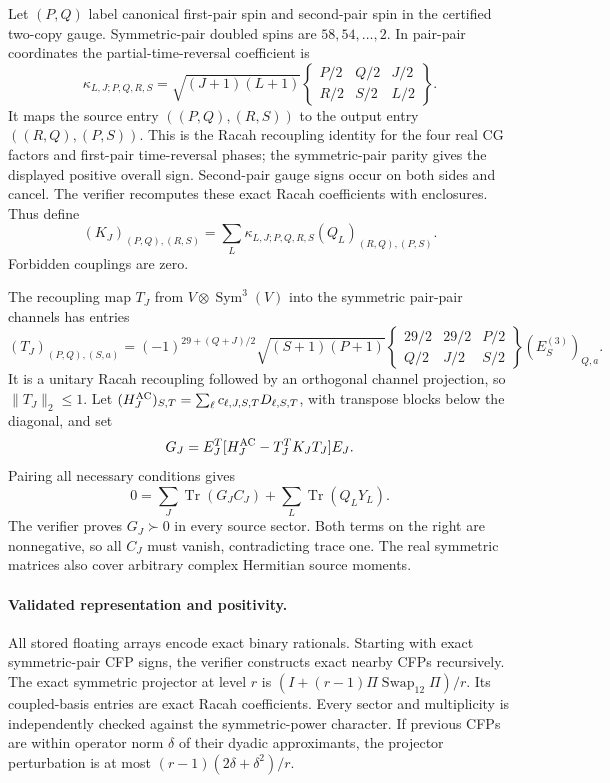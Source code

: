\documentclass[11pt]{article}
\newcommand{\Tr}{\operatorname{Tr}}
\begin{document}
Let $(P,Q)$ label canonical first-pair spin and second-pair spin in the certified two-copy gauge. Symmetric-pair doubled spins are $58,54,\ldots,2$. In pair-pair coordinates the partial-time-reversal coefficient is
\[
 \kappa_{L,J;P,Q,R,S}=\sqrt{(J+1)(L+1)}
 \begin{Bmatrix}P/2&Q/2&J/2\\R/2&S/2&L/2\end{Bmatrix}.
\]
It maps the source entry $((P,Q),(R,S))$ to the output entry $((R,Q),(P,S))$. This is the Racah recoupling identity for the four real CG factors and first-pair time-reversal phases; the symmetric-pair parity gives the displayed positive overall sign. Second-pair gauge signs occur on both sides and cancel. The verifier recomputes these exact Racah coefficients with enclosures. Thus define
\[
 (K_J)_{(P,Q),(R,S)}=\sum_L\kappa_{L,J;P,Q,R,S}
 (Q_L)_{(R,Q),(P,S)}.
\]
Forbidden couplings are zero.

The recoupling map $T_J$ from $V\otimes\operatorname{Sym}^3(V)$ into the symmetric pair-pair channels has entries
\[
 (T_J)_{(P,Q),(S,a)}=(-1)^{29+(Q+J)/2}\sqrt{(S+1)(P+1)}
 \begin{Bmatrix}29/2&29/2&P/2\\Q/2&J/2&S/2\end{Bmatrix}
 (E^{(3)}_S)_{Q,a}.
\]
It is a unitary Racah recoupling followed by an orthogonal channel projection, so $\|T_J\|_2\le1$. Let $(H_J^{\rm AC})_{S,T}=\sum_\ell c_{\ell,J,S,T}D_{\ell,S,T}$, with transpose blocks below the diagonal, and set
\[
 G_J=E_J^T[H_J^{\rm AC}-T_J^TK_JT_J]E_J.
\]
Pairing all necessary conditions gives
\[
 0=\sum_J\Tr(G_JC_J)+\sum_L\Tr(Q_LY_L).
\]
The verifier proves $G_J\succ0$ in every source sector. Both terms on the right are nonnegative, so all $C_J$ must vanish, contradicting trace one. The real symmetric matrices also cover arbitrary complex Hermitian source moments.

\paragraph{Validated representation and positivity.}
All stored floating arrays encode exact binary rationals. Starting with exact symmetric-pair CFP signs, the verifier constructs exact nearby CFPs recursively. The exact symmetric projector at level $r$ is $(I+(r-1)\Pi\operatorname{Swap}_{12}\Pi)/r$. Its coupled-basis entries are exact Racah coefficients. Every sector and multiplicity is independently checked against the symmetric-power character. If previous CFPs are within operator norm $\delta$ of their dyadic approximants, the projector perturbation is at most $(r-1)(2\delta+\delta^2)/r$.
\end{document}
